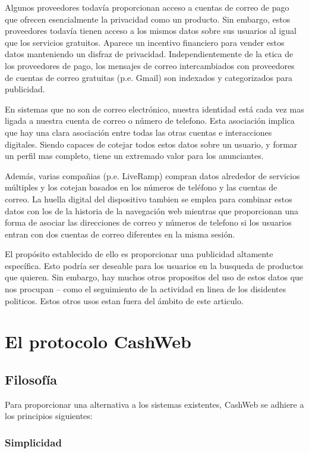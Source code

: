 \documentclass{article}
\begin{document}
Algunos proveedores todavía proporcionan acceso a cuentas de correo de pago que ofrecen esencialmente la privacidad como un producto. Sin embargo, estos proveedores todavía tienen acceso a los mismos datos sobre sus usuarios al igual que los servicios gratuitos. Aparece un incentivo financiero para vender estos datos manteniendo un disfraz de privacidad. Independientemente de la etica de los proveedores de pago, los mensajes de correo intercambiados con proveedores de cuentas de correo gratuitas (p.e. Gmail) son indexados y categorizados para publicidad.

En sistemas que no son de correo electrónico, nuestra identidad está cada vez mas ligada a nuestra cuenta de correo o número de telefono. Esta asociación implica que hay una clara asociación entre todas las otras cuentas e interacciones digitales. Siendo capaces de cotejar todos estos datos sobre un usuario, y formar un perfil mas completo, tiene un extremado valor para los anunciantes.

Además, varias compañias (p.e. LiveRamp) compran datos alrededor de servicios múltiples y los cotejan basados en los números de teléfono y las cuentas de correo. La huella digital del dispositivo tambien se emplea para combinar estos datos con los de la historia de la navegación web mientras que proporcionan una forma de asociar las direcciones de correo y números de telefono si los usuarios entran con dos cuentas de correo diferentes en la misma sesión.

El propósito establecido de ello es proporcionar una publicidad altamente específica. Esto podría ser deseable para los usuarios en la busqueda de productos que quieren. Sin embargo, hay muchos otros propositos del uso de estos datos que nos procupan -- como el seguimiento de la actividad en linea de los disidentes politicos. Estos otros usos estan fuera del ámbito de este articulo.

\section{El protocolo CashWeb}

\subsection{Filosofía}

Para proporcionar una alternativa a los sistemas existentes, CashWeb se adhiere a los principios siguientes:

\subsubsection{Simplicidad}
\end{document}
